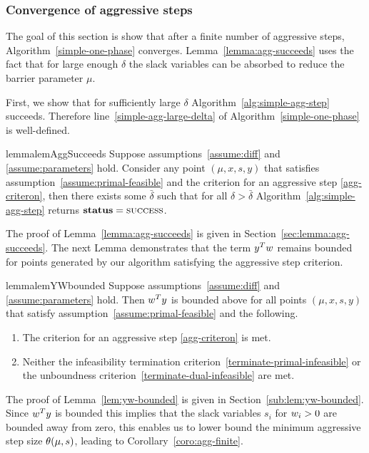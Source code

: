 \documentclass{article}
\begin{document}
\subsubsection{Convergence of aggressive steps}
The goal of this section is show that after a finite number of aggressive steps, Algorithm~\ref{simple-one-phase} converges. Lemma~\ref{lemma:agg-succeeds} uses the fact that for large enough $\delta$ the slack variables can be absorbed to reduce the barrier parameter $\mu$. 

First, we show that for sufficiently large $\delta$ Algorithm~\ref{alg:simple-agg-step} succeeds. Therefore line~\ref{simple-agg-large-delta} of Algorithm~\ref{simple-one-phase} is well-defined. 

\begin{restatable}{lemma}{lemAggSucceeds}\label{lemma:agg-succeeds}
Suppose assumptions~\ref{assume:diff} and \ref{assume:parameters} hold. Consider any point $(\mu, x, s, y)$ that satisfies assumption~\ref{assume:primal-feasible} and the criterion for an aggressive step \eqref{agg-criteron}, then there exists some $\bar{\delta}$ such that for all $\delta > \bar{\delta}$ Algorithm~\ref{alg:simple-agg-step} returns $\textbf{status} = \textsc{success}$.
\end{restatable}

The proof of Lemma~\ref{lemma:agg-succeeds} is given in Section~\ref{sec:lemma:agg-succeeds}. The next Lemma demonstrates that the term $y^T w$ remains bounded for points generated by our algorithm satisfying the aggressive step criterion.

\begin{restatable}{lemma}{lemYWbounded}\label{lem:yw-bounded}
Suppose assumptions~\ref{assume:diff} and \ref{assume:parameters} hold. Then $w^T y$ is bounded above for all points $(\mu, x, s, y)$ that satisfy assumption~\ref{assume:primal-feasible} and the following.
\begin{enumerate}
\item The criterion for an aggressive step \eqref{agg-criteron} is met.
\item Neither the infeasibility termination criterion~\eqref{terminate-primal-infeasible} or the unboundness criterion~\eqref{terminate-dual-infeasible} are met.
\end{enumerate}
\end{restatable}

The proof of Lemma~\ref{lem:yw-bounded} is given in Section~\ref{sub:lem:yw-bounded}. Since $w^T y$ is bounded this implies that the slack variables $s_i$ for $w_i > 0$ are bounded away from zero, this enables us to lower bound the minimum aggressive step size $\theta(\mu, s)$, leading to Corollary~\ref{coro:agg-finite}.
\end{document}

